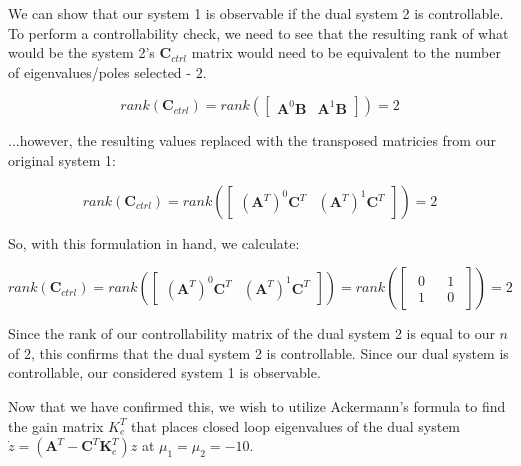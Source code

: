 \documentclass{article}
\begin{document}
We can show that our system 1 is observable if the dual system 2 is controllable. To perform a controllability check, we need to see that the resulting rank of what would be the system 2's $\boldsymbol{C}_{ctrl}$ matrix would need to be equivalent to the number of eigenvalues/poles selected - $2$.

\begin{equation}
    rank(\boldsymbol{C}_{ctrl}) = rank(\begin{bmatrix}
        \boldsymbol{A}^0\boldsymbol{B} & \boldsymbol{A}^1\boldsymbol{B}
    \end{bmatrix}) = 2
\end{equation}

\noindent ...however, the resulting values replaced with the transposed matricies from our original system 1:

\begin{equation}
    rank(\boldsymbol{C}_{ctrl}) = rank(\begin{bmatrix}
        (\boldsymbol{A}^T)^0\boldsymbol{C}^T & (\boldsymbol{A}^T)^1\boldsymbol{C}^T
    \end{bmatrix}) = 2
\end{equation}

So, with this formulation in hand, we calculate:

\begin{equation}
    rank(\boldsymbol{C}_{ctrl}) = rank(\begin{bmatrix}
        (\boldsymbol{A}^T)^0\boldsymbol{C}^T & (\boldsymbol{A}^T)^1\boldsymbol{C}^T
    \end{bmatrix}) = rank(\begin{bmatrix}
        \begin{matrix}
            0 \\ 1
        \end{matrix} &
        \begin{matrix}
            1 \\ 0
        \end{matrix}
    \end{bmatrix}) = 2
\end{equation}

Since the rank of our controllability matrix of the dual system 2 is equal to our $n$ of $2$, this confirms that the dual system 2 is controllable. Since our dual system is controllable, our considered system 1 is observable.

Now that we have confirmed this, we wish to utilize Ackermann's formula to find the gain matrix $K_e^T$ that places closed loop eigenvalues of the dual system $\dot{z}=(\boldsymbol{A}^T-\boldsymbol{C}^T\boldsymbol{K}_e^T)z$ at $\mu_1=\mu_2=-10$.
\end{document}
